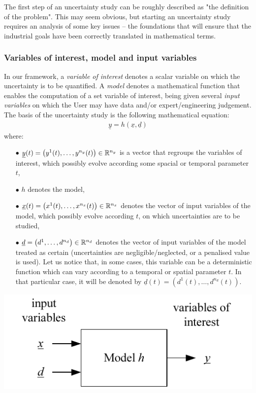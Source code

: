 The first step of an uncertainty study can be roughly described as "the definition of the problem". This may seem obvious, but starting an uncertainty study requires an analysis of some key issues -- the foundations that will ensure that the industrial goals have been correctly translated in mathematical terms.

\subsubsection{Variables of interest, model and input variables}

In our framework, a {\em variable of interest} denotes a scalar variable on which the uncertainty is to be quantified. A {\em model} denotes a mathematical function that enables the computation of a set variable of interest, being given several {\em input variables} on which the User may have data and/or expert/engineering judgement. The basis of the uncertainty study is the following mathematical equation:
\begin{align*}
  \underline{y} = h \left( \underline{x},\underline{d} \right)
\end{align*}
where:
\begin{itemize}
\item[$\bullet$] $\underline{y}(t) = \left( y^1(t),\ldots,y^{n_y}(t) \right) \in {\mathbb R}^{n_y}$ is a vector that regroups the variables of interest, which possibly evolve according some spacial or temporal parameter $t$,
\item[$\bullet$] $h$ denotes the model,
\item[$\bullet$] $\underline{x}(t) = \left( x^1(t),\ldots,x^{n_x}(t) \right) \in {\mathbb R}^{n_x}$ denotes the vector of input variables of the model, which possibly evolve according $t$, on which uncertainties are to be studied,
\item[$\bullet$] $\underline{d}= \left( d^1,\ldots,d^{n_d} \right) \in {\mathbb R}^{n_d}$ denotes the vector of input variables of the model treated as certain (uncertainties are negligible/neglected, or a penalised value is used). Let us notice that, in some cases, this variable can be a deterministic function which can vary according to a temporal or spatial parameter $t$. In that particular case, it will be denoted by $\underline{d}(t)= \left( d^1(t),\ldots,d^{n_d}(t) \right)$.
\end{itemize}

\begin{center}
  \includegraphics[scale=0.8]{Figures/flow.pdf}
\end{center}

